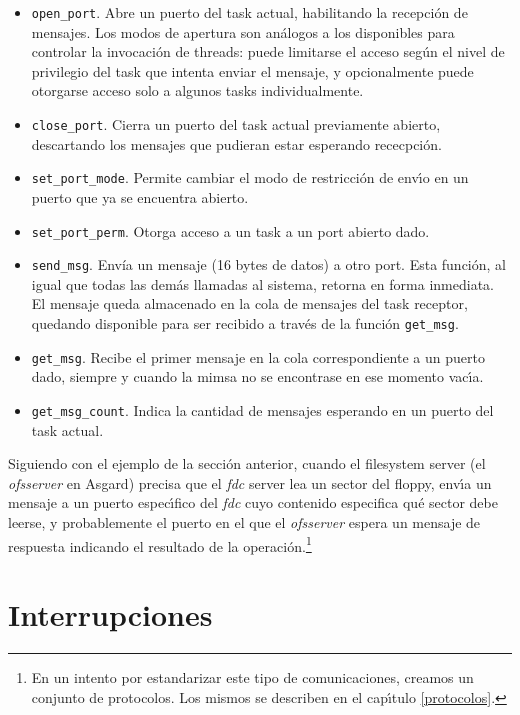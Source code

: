 \documentclass[11pt, letterpaper, twoside]{book}
\begin{document}
\begin{itemize}

\item[] \texttt{open\_port}. Abre un puerto del task actual, habilitando la recepci\'on de mensajes. Los modos de apertura son an\'alogos a los disponibles para controlar la invocaci\'on de threads: puede limitarse el acceso seg\'un el nivel de privilegio del task que intenta enviar el mensaje, y opcionalmente puede otorgarse acceso solo a algunos tasks individualmente.
\item[] \texttt{close\_port}. Cierra un puerto del task actual previamente abierto, descartando los mensajes que pudieran estar esperando rececpci\'on.
\item[] \texttt{set\_port\_mode}. Permite cambiar el modo de restricci\'on de env\'\i{}o en un puerto que ya se encuentra abierto.
\item[] \texttt{set\_port\_perm}. Otorga acceso a un task a un port abierto dado.
\item[] \texttt{send\_msg}. Env\'ia un mensaje (16 bytes de datos) a otro port. Esta funci\'on, al igual que todas las dem\'as llamadas al sistema, retorna en forma inmediata. El mensaje queda almacenado en la cola de mensajes del task receptor, quedando disponible para ser recibido a trav\'es de la funci\'on \texttt{get\_msg}.
\item[] \texttt{get\_msg}. Recibe el primer mensaje en la cola correspondiente a un puerto dado, siempre y cuando la mimsa no se encontrase en ese momento vac\'\i{}a.
\item[] \texttt{get\_msg\_count}. Indica la cantidad de mensajes esperando en un puerto del task actual.

\end{itemize}

Siguiendo con el ejemplo de la secci\'on anterior, cuando el filesystem server (el \emph{ofsserver} en Asgard) precisa que el \emph{fdc} server lea un sector del floppy, env\'\i{}a un mensaje a un puerto espec\'\i{}fico del \emph{fdc} cuyo contenido especifica qu\'e sector debe leerse, y probablemente el puerto en el que el \emph{ofsserver} espera un mensaje de respuesta indicando el resultado de la operaci\'on.\footnote{En un intento por estandarizar este tipo de comunicaciones, creamos un conjunto de protocolos. Los mismos se describen en el cap\'\i{}tulo \ref{protocolos}.}

\section{Interrupciones}
\end{document}

